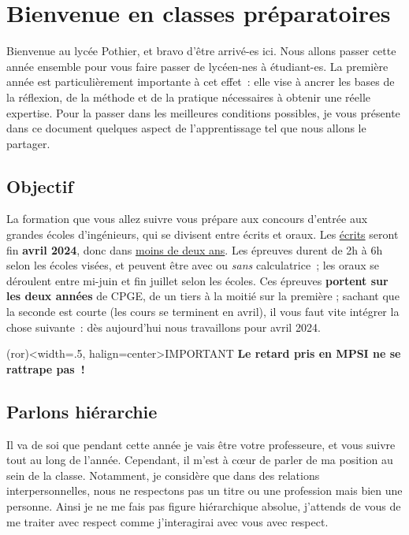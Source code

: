 \documentclass[a4paper, 10pt, final, garamond]{book}
\begin{document}
\setcounter{chapter}{-1}

\chapter*{Bienvenue en classes pr\'eparatoires}

Bienvenue au lycée Pothier, et bravo d'être arrivé-es ici. Nous allons passer
cette année ensemble pour vous faire passer de lycéen-nes à étudiant-es. La
première année est particulièrement importante à cet effet~: elle vise à ancrer
les bases de la réflexion, de la méthode et de la pratique nécessaires à obtenir
une réelle expertise. Pour la passer dans les meilleures conditions possibles,
je vous présente dans ce document quelques aspect de l'apprentissage tel que
nous allons le partager.

\section{Objectif}

\begin{tcbraster}[raster columns=4, raster equal height=rows]
	\begin{tcolorbox}[blankest, raster multicolumn=3]
		La formation que vous allez suivre vous prépare aux concours d'entrée
		aux grandes écoles d'ingénieurs, qui se divisent entre écrits et oraux.
		Les \underline{écrits} seront fin \textbf{avril 2024}, donc dans
		\underline{moins de deux ans}. Les épreuves durent de 2h à 6h selon les
		écoles visées, et peuvent être avec ou \textit{sans} calculatrice~; les
		oraux se déroulent entre mi-juin et fin juillet selon les écoles. Ces
		épreuves \textbf{portent sur les deux années} de CPGE, de un tiers à la
		moitié sur la première ; sachant que la seconde est courte (les cours se
		terminent en avril), il vous faut vite intégrer la chose suivante~: dès
		aujourd'hui nous travaillons pour avril 2024.
	\end{tcolorbox}
	\begin{tcb}[fil](ror)<width=.5\linewidth, halign=center>{IMPORTANT}
		\textbf{Le retard pris en MPSI ne se rattrape pas~!}
	\end{tcb}
\end{tcbraster}

\section{Parlons hiérarchie}

Il va de soi que pendant cette année je vais être votre professeure, et vous
suivre tout au long de l'année. Cependant, il m'est à cœur de parler de ma
position au sein de la classe. Notamment, je considère que dans des relations
interpersonnelles, nous ne respectons pas un titre ou une profession mais bien
une personne. Ainsi je ne me fais pas figure hiérarchique absolue, j'attends de
vous de me traiter avec respect comme j'interagirai avec vous avec respect.
\end{document}
